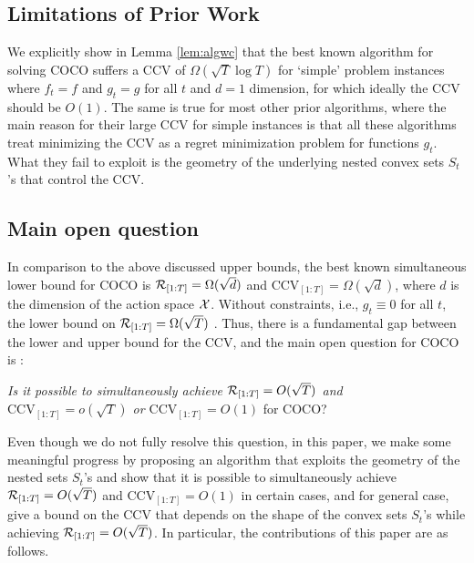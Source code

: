 \subsection{Limitations of Prior Work}
We explicitly show in Lemma \ref{lem:algwc} that the best known algorithm \cite{Sinha2024} for solving COCO suffers a CCV of $\Omega(\sqrt{T}\log T)$ for `simple' problem instances where $f_t=f$ and $g_t=g$ for all $t$ and $d=1$ dimension, for which ideally the CCV should be $O(1)$. The same is true for most other prior algorithms, where the main reason for their large CCV for simple instances is that all these algorithms treat minimizing the CCV as a regret minimization problem for functions $g_t$. What they fail to exploit is the geometry of the 
underlying nested convex sets $S_t$'s  that control the CCV.
\subsection{Main open question}

In comparison to the above discussed upper bounds, the best known simultaneous lower bound \cite{Sinha2024}  for COCO is $\mathcal{R}_{[1:T]} = \Omega(\sqrt{d})$ and $\text{CCV}_{[1:T]} = \Omega(\sqrt{d})$, where $d$ is the dimension of the action space $\mathcal{X}$. Without constraints, i.e., $g_t\equiv0$ for all $t$, the lower bound on $\mathcal{R}_{[1:T]} = \Omega(\sqrt{T})$ \cite{Hazan}.
Thus, there is a fundamental gap between the lower and upper bound for the CCV, and the main open question for COCO is : 

{\it  Is it possible to simultaneously achieve $\mathcal{R}_{[1:T]} =O(\sqrt{T})$ and $\text{CCV}_{[1:T]} = o(\sqrt{T})$ or $\text{CCV}_{[1:T]} = O(1)$} for COCO?

Even though we do not fully resolve this question, in this paper, we make some meaningful progress by proposing an algorithm that exploits the geometry of the nested sets $S_t$'s and show that it is possible to simultaneously achieve  $\mathcal{R}_{[1:T]} =O(\sqrt{T})$ and $\text{CCV}_{[1:T]} = O(1)$ in certain cases, and for general case, give a bound on the CCV that depends on the shape of the convex sets $S_t$'s while achieving  $\mathcal{R}_{[1:T]} =O(\sqrt{T})$. In particular, the contributions of this paper are as follows.

